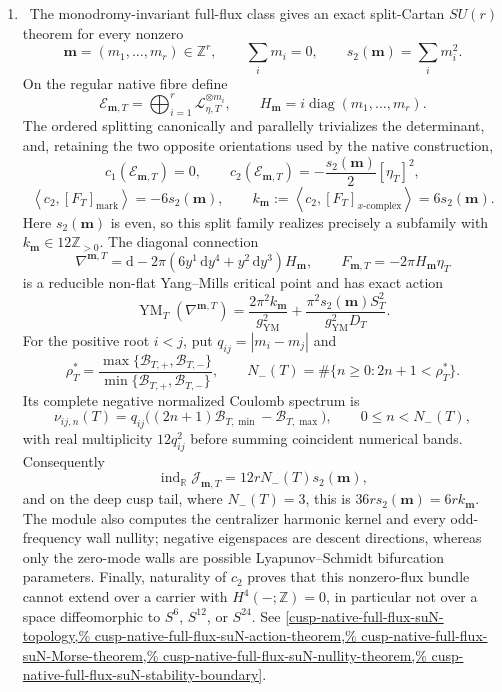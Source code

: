 \begin{enumerate}[leftmargin=1.8em]
\item \Verified\ The monodromy-invariant full-flux class gives an exact
split-Cartan \(SU(r)\) theorem for every nonzero
\[
 \mathbf m=(m_1,\ldots,m_r)\in\mathbb Z^r,
 \qquad \sum_i m_i=0,
 \qquad s_2(\mathbf m)=\sum_i m_i^2.
\]
On the regular native fibre define
\[
 \mathscr E_{\mathbf m,T}
 =\bigoplus_{i=1}^r\mathscr L_{\eta,T}^{\otimes m_i},
 \qquad H_{\mathbf m}=i\operatorname{diag}(m_1,\ldots,m_r).
\]
The ordered splitting canonically and parallelly trivializes the determinant,
and, retaining the two opposite orientations used by the native construction,
\[
 c_1(\mathscr E_{\mathbf m,T})=0,
 \qquad
 c_2(\mathscr E_{\mathbf m,T})
 =-\frac{s_2(\mathbf m)}2[\eta_T]^2,
\]
\[
 \left\langle c_2,[F_T]_{\mathrm{mark}}\right\rangle=-6s_2(\mathbf m),
 \qquad
 k_{\mathbf m}:=
 \left\langle c_2,[F_T]_{x\text{-}\mathrm{complex}}\right\rangle
 =6s_2(\mathbf m).
\]
Here \(s_2(\mathbf m)\) is even, so this split family realizes precisely a
subfamily with \(k_{\mathbf m}\in12\mathbb Z_{>0}\).  The diagonal connection
\[
 \nabla^{\mathbf m,T}
 =\mathrm d-2\pi(6y^1\,\mathrm dy^4+y^2\,\mathrm dy^3)H_{\mathbf m},
 \qquad F_{\mathbf m,T}=-2\pi H_{\mathbf m}\eta_T
\]
is a reducible non-flat Yang--Mills critical point and has exact action
\[
 \operatorname{YM}_T(\nabla^{\mathbf m,T})
 =\frac{2\pi^2k_{\mathbf m}}{g_{\mathrm{YM}}^2}
  +\frac{\pi^2s_2(\mathbf m)S_T^2}{g_{\mathrm{YM}}^2D_T}.
\]
For the positive root \(i<j\), put \(q_{ij}=|m_i-m_j|\) and
\[
 \rho_T^*=\frac{\max\{\mathcal B_{T,+},\mathcal B_{T,-}\}}
                  {\min\{\mathcal B_{T,+},\mathcal B_{T,-}\}},
 \qquad
 N_-(T)=\#\{n\ge0:2n+1<\rho_T^*\}.
\]
Its complete negative normalized Coulomb spectrum is
\[
 \nu_{ij,n}(T)=q_{ij}
 \bigl((2n+1)\mathcal B_{T,\min}-\mathcal B_{T,\max}\bigr),
 \qquad 0\le n<N_-(T),
\]
with real multiplicity \(12q_{ij}^2\) before summing coincident numerical
bands.  Consequently
\[
 \operatorname{ind}_{\mathbb R}\mathcal J_{\mathbf m,T}
 =12rN_-(T)s_2(\mathbf m),
\]
and on the deep cusp tail, where \(N_-(T)=3\), this is
\(36r s_2(\mathbf m)=6rk_{\mathbf m}\).  The module also computes the
centralizer harmonic kernel and every odd-frequency wall nullity; negative
eigenspaces are descent directions, whereas only the zero-mode walls are
possible Lyapunov--Schmidt bifurcation parameters.  Finally, naturality of
\(c_2\) proves that this nonzero-flux bundle cannot extend over a carrier
with \(H^4(-;\mathbb Z)=0\), in particular not over a space diffeomorphic to
\(S^6\), \(S^{12}\), or \(S^{24}\).  See
\cref{cusp-native-full-flux-suN-topology,%
cusp-native-full-flux-suN-action-theorem,%
cusp-native-full-flux-suN-Morse-theorem,%
cusp-native-full-flux-suN-nullity-theorem,%
cusp-native-full-flux-suN-stability-boundary}.


\end{enumerate}
